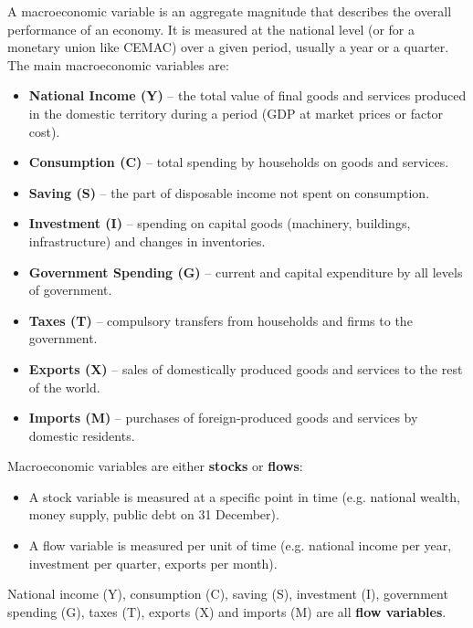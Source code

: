 \documentclass[11pt]{article}
\newcommand{\cle}[1]{{\popxbold\color{popdark}#1}}
\begin{document}
\begin{definition}
A \cle{macroeconomic variable} is an aggregate magnitude that describes the overall performance of an economy. It is measured at the national level (or for a monetary union like CEMAC) over a given period, usually a year or a quarter. The main macroeconomic variables are:
\begin{itemize}
    \item \textbf{National Income (Y)} – the total value of final goods and services produced in the domestic territory during a period (GDP at market prices or factor cost).
    \item \textbf{Consumption (C)} – total spending by households on goods and services.
    \item \textbf{Saving (S)} – the part of disposable income not spent on consumption.
    \item \textbf{Investment (I)} – spending on capital goods (machinery, buildings, infrastructure) and changes in inventories.
    \item \textbf{Government Spending (G)} – current and capital expenditure by all levels of government.
    \item \textbf{Taxes (T)} – compulsory transfers from households and firms to the government.
    \item \textbf{Exports (X)} – sales of domestically produced goods and services to the rest of the world.
    \item \textbf{Imports (M)} – purchases of foreign‑produced goods and services by domestic residents.
\end{itemize}
\end{definition}

\begin{propriete}
Macroeconomic variables are either \textbf{stocks} or \textbf{flows}:
\begin{itemize}
    \item A \cle{stock variable} is measured at a specific point in time (e.g. national wealth, money supply, public debt on 31 December).
    \item A \cle{flow variable} is measured per unit of time (e.g. national income per year, investment per quarter, exports per month).
\end{itemize}
National income (Y), consumption (C), saving (S), investment (I), government spending (G), taxes (T), exports (X) and imports (M) are all \textbf{flow variables}.
\end{propriete}
\end{document}
